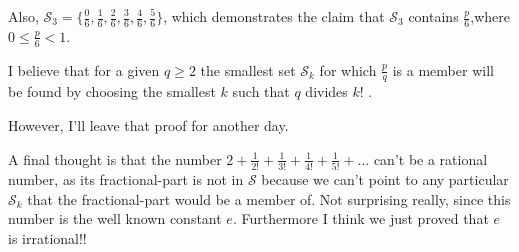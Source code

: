 \documentclass{article}
\begin{document}
Also, \(
\mathcal{S}_3
= \{
\frac{ 0}{6},
\frac{ 1}{6},
\frac{ 2}{6},
\frac{ 3}{6},
\frac{ 4}{6},
\frac{ 5}{6}
\}
\),
which demonstrates the claim that \(\mathcal{S}_3\)
contains \(\frac{p}{6}\),\newline where \(0 \le{} \frac{p}{6} < 1\).

I believe that for a given \(q \ge 2\) the smallest set \(\mathcal{S}_k\) for which \(\frac{p}{q}\)
is a member
will be found by choosing the smallest
\(k\) such that \(q\) divides \(k!\)\! .

However, I'll leave that proof for another day.

A final thought is that the number 
\(2\!+\!\frac{1}{2!}\!+\!\frac{1}{3!}\!+\!\frac{1}{4!}\!+\!\frac{1}{5!}\!+\!\dots{}\) can't
be a rational number, as its fractional-part is not in \(\mathcal{S}\)
because we can't point to any particular \(\mathcal{S}_k\) that the fractional-part would be a member of.
Not surprising really, since this number is the well known constant \(e\).
Furthermore I think we just proved that \(e\) is irrational!!
\end{document}
